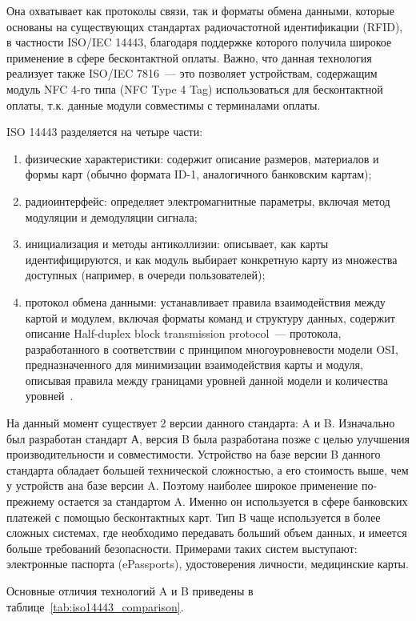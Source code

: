 Она охватывает как протоколы связи, так и форматы обмена данными, которые основаны на существующих стандартах радиочастотной идентификации (RFID), в частности ISO/IEC 14443, благодаря поддержке которого получила широкое применение в сфере бесконтактной оплаты.
Важно, что данная технология реализует также ISO/IEC 7816~--- это позволяет устройствам, содержащим модуль NFC 4-го типа (NFC Type 4 Tag) использоваться для бесконтактной оплаты, т.к. данные модули совместимы с терминалами оплаты.

ISO 14443 разделяется на четыре части:

\begin{enumerate}
    \item физические характеристики: содержит описание размеров, материалов и формы карт (обычно формата ID-1, аналогичного банковским картам);
    \item радиоинтерфейс: определяет электромагнитные параметры, включая метод модуляции и демодуляции сигнала;
    \item инициализация и методы антиколлизии: описывает, как карты идентифицируются, и как модуль выбирает конкретную карту из множества доступных (например, в очереди пользователей);
    \item протокол обмена данными: устанавливает правила взаимодействия между картой и модулем, включая форматы команд и структуру данных, содержит описание Half-duplex block transmission protocol~--- протокола, разработанного в соответствии с принципом многоуровневости модели OSI, предназначенного для минимизации взаимодействия карты и модуля, описывая правила между границами уровней данной модели и количества уровней~\cite{iso_14443_en}.
\end{enumerate}


На данный момент существует 2 версии данного стандарта: A и B.
Изначально был разработан стандарт А, версия B была разработана позже с целью улучшения производительности и совместимости.
Устройство на базе версии B данного стандарта обладает большей технической сложностью, а его стоимость выше, чем у устройств ана базе версии A.
Поэтому наиболее широкое применение по-прежнему остается за стандартом A.
Именно он используется в сфере банковских платежей с помощью бесконтактных карт.
Тип B чаще используется в более сложных системах, где необходимо передавать больший объем данных, и имеется больше требований безопасности.
Примерами таких систем выступают: электронные паспорта (ePassports), удостоверения личности, медицинские карты.

Основные отличия технологий A и B приведены в таблице~\ref{tab:iso14443_comparison}.

